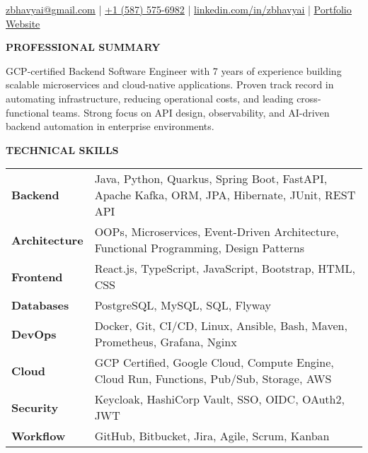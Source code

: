\documentclass[a4paper]{article}
\newcommand{\header} [1] {
    \vspace{6pt}
    {\hspace*{-18pt} \textcolor{Accent}{\large\textbf{\MakeUppercase{#1}}}}
    \vspace{-7pt} \\
    {\color{Accent}\hspace*{-18pt} \hrulefill \hspace*{-7pt}}
}
\begin{document}
\begin{center}
   {}
\end{center}
\vspace{-10pt}

\begin{center}
    \href{mailto:zbhavyai@gmail.com}{\uline{zbhavyai@gmail.com}} \quad|\quad
    \href{tel:+15875756982}{\uline{+1 (587) 575-6982}} \quad|\quad
    \href{https://linkedin.com/in/zbhavyai}{\uline{linkedin.com/in/zbhavyai}} \quad|\quad
    \href{https://zbhavyai.github.io}{\uline{Portfolio Website}}
\end{center}


\header{Professional Summary}

\vspace{-8pt}
\begin{justify}
{\fontsize{9.0pt}{11pt}\selectfont GCP-certified Backend Software Engineer with 7 years of experience building scalable microservices and cloud-native applications. Proven track record in automating infrastructure, reducing operational costs, and leading cross-functional teams. Strong focus on API design, observability, and AI-driven backend automation in enterprise environments.}
\end{justify}
\vspace{-4pt}


\header{Technical Skills}

\vspace{2pt}
{\fontsize{9.0pt}{11pt}\selectfont
\begin{tabular}{ l l }
    \textbf{Backend}       & Java, Python, Quarkus, Spring Boot, FastAPI, Apache Kafka, ORM, JPA, Hibernate, JUnit, REST API    \\
    \textbf{Architecture}  & OOPs, Microservices, Event-Driven Architecture, Functional Programming, Design Patterns            \\
    \textbf{Frontend}      & React.js, TypeScript, JavaScript, Bootstrap, HTML, CSS                                             \\
    \textbf{Databases}     & PostgreSQL, MySQL, SQL, Flyway                                                                     \\
    \textbf{DevOps}        & Docker, Git, CI/CD, Linux, Ansible, Bash, Maven, Prometheus, Grafana, Nginx                        \\
    \textbf{Cloud}         & GCP Certified, Google Cloud, Compute Engine, Cloud Run, Functions, Pub/Sub, Storage, AWS           \\
    \textbf{Security}      & Keycloak, HashiCorp Vault, SSO, OIDC, OAuth2, JWT                                                  \\
    \textbf{Workflow}      & GitHub, Bitbucket, Jira, Agile, Scrum, Kanban                                                      \\
\end{tabular}
}
\end{document}
